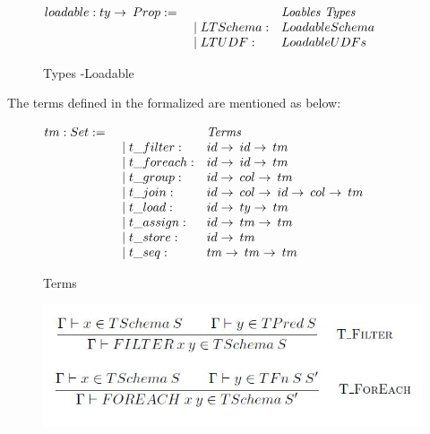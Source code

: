 \begin{figure}
\begin{center}
	$\begin{array}{@{}l@{~}l@{\quad}l@{\!\!\!\!\!\!}r}
	loadable : ty \rightarrow \:Prop := & \ \ \ \ \ & \emph{Loables Types} \\
	& \quad \mid LTSchema: & Loadable Schema\\
	& \quad \mid LTUDF: & Loadable UDFs\\
	\end{array}$
\end{center}
\caption{Types -Loadable}
\label{fig-loadable}
\end{figure} 

The terms defined in the formalized are mentioned as below:

\begin{figure}
\begin{center}
$\begin{array}{@{}l@{~}l@{\quad}l@{\!\!\!\!\!\!}r}
tm : Set := & \ \ \ \ \ & \emph{Terms} \\
& \quad \mid t\_filter: & id \rightarrow \:id \rightarrow \:tm\\
& \quad \mid t\_foreach: & id \rightarrow \:id \rightarrow \:tm\\
& \quad \mid t\_group: & id \rightarrow \:col \rightarrow \:tm\\
& \quad \mid t\_join: & id \rightarrow \:col \rightarrow \:id \rightarrow \:col \rightarrow \:tm\\
& \quad \mid t\_load: & id \rightarrow \:ty \rightarrow \:tm\\
& \quad \mid t\_assign: & id \rightarrow \:tm \rightarrow \:tm\\
& \quad \mid t\_store: & id \rightarrow \:tm\\
& \quad \mid t\_seq: & tm \rightarrow \:tm \rightarrow \:tm\\
\end{array}
$
\end{center}
\caption{Terms}
\label{fig-terms}
\end{figure}

\begin{figure}
\centering
  \includegraphics[width=1\linewidth]{Images/FilterForeach.JPG}
  \label{fig:filter_foreach}
\end{figure}



